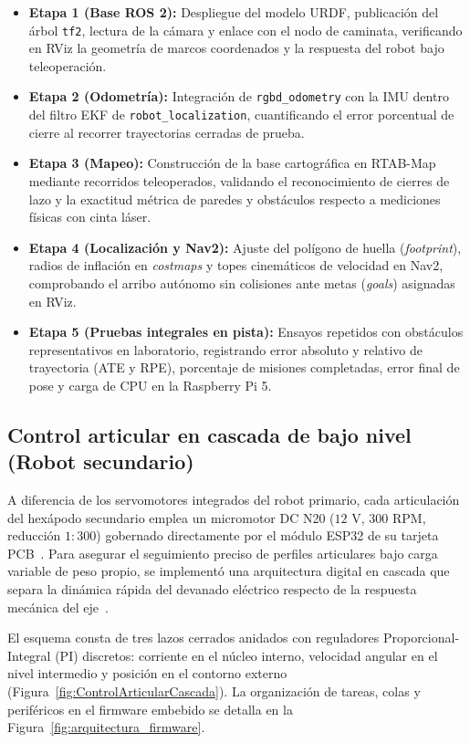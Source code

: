 \begin{itemize}
    \item \textbf{Etapa 1 (Base ROS 2):} Despliegue del modelo URDF, publicación del árbol \texttt{tf2}, lectura de la cámara y enlace con el nodo de caminata, verificando en RViz la geometría de marcos coordenados y la respuesta del robot bajo teleoperación.
    \item \textbf{Etapa 2 (Odometría):} Integración de \texttt{rgbd\_odometry} con la IMU dentro del filtro EKF de \texttt{robot\_localization}, cuantificando el error porcentual de cierre al recorrer trayectorias cerradas de prueba.
    \item \textbf{Etapa 3 (Mapeo):} Construcción de la base cartográfica en RTAB-Map mediante recorridos teleoperados, validando el reconocimiento de cierres de lazo y la exactitud métrica de paredes y obstáculos respecto a mediciones físicas con cinta láser.
    \item \textbf{Etapa 4 (Localización y Nav2):} Ajuste del polígono de huella (\textit{footprint}), radios de inflación en \textit{costmaps} y topes cinemáticos de velocidad en Nav2, comprobando el arribo autónomo sin colisiones ante metas (\textit{goals}) asignadas en RViz.
    \item \textbf{Etapa 5 (Pruebas integrales en pista):} Ensayos repetidos con obstáculos representativos en laboratorio, registrando error absoluto y relativo de trayectoria (ATE y RPE), porcentaje de misiones completadas, error final de pose y carga de CPU en la Raspberry Pi 5.
\end{itemize}


\subsection{Control articular en cascada de bajo nivel (Robot secundario)}

A diferencia de los servomotores integrados del robot primario, cada articulación del hexápodo secundario emplea un micromotor DC N20 ($12\text{ V}$, $300\text{ RPM}$, reducción $1:300$) gobernado directamente por el módulo ESP32 de su tarjeta PCB~\cite{N20_Datasheet}. Para asegurar el seguimiento preciso de perfiles articulares bajo carga variable de peso propio, se implementó una arquitectura digital en cascada que separa la dinámica rápida del devanado eléctrico respecto de la respuesta mecánica del eje~\cite{TexasInstruments_CurrentLoop, RobetGautier_CascadedLoops_2014, threeLoopControl1}.

El esquema consta de tres lazos cerrados anidados con reguladores Proporcional-Integral (PI) discretos: corriente en el núcleo interno, velocidad angular en el nivel intermedio y posición en el contorno externo (Figura~\ref{fig:ControlArticularCascada}). La organización de tareas, colas y periféricos en el firmware embebido se detalla en la Figura~\ref{fig:arquitectura_firmware}.


